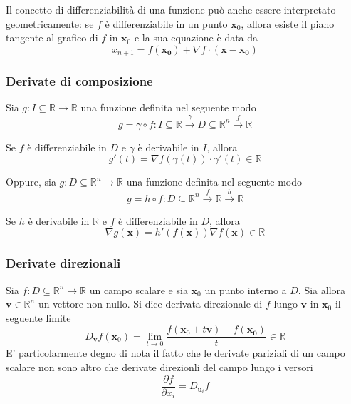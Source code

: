             Il concetto di differenziabilità di una funzione può anche essere interpretato geometricamente: se $f$ è differenziabile in un punto $\mathbf{x}_0$, allora
            esiste il piano tangente al grafico di $f$ in $\mathbf{x}_0$ e la sua equazione è data da
            \[
                x_{n + 1} = f(\mathbf{x_0}) + \nabla f \cdot (\mathbf{x} - \mathbf{x_0})
            \]

        \subsubsection{Derivate di composizione}
            Sia $g: I \subseteq \mathbb{R} \rightarrow \mathbb{R}$ una funzione definita nel seguente modo
            \[
                g = \gamma \circ f: I \subseteq \mathbb{R} \xrightarrow{\gamma} D \subseteq \mathbb{R}^{n} \xrightarrow{f} \mathbb{R}
            \]

            Se $f$ è differenziabile in $D$ e $\gamma$ è derivabile in $I$, allora
            \[
                g'(t) = \nabla f(\gamma(t)) \cdot \gamma'(t) \in \mathbb{R}
            \]

            Oppure, sia $g: D \subseteq \mathbb{R}^{n} \rightarrow \mathbb{R}$ una funzione definita nel seguente modo
            \[
                g = h \circ f : D \subseteq \mathbb{R}^{n} \xrightarrow{f} \mathbb{R} \xrightarrow{h} \mathbb{R}
            \]

            Se $h$ è derivabile in $\mathbb{R}$ e $f$ è differenziabile in $D$, allora
            \[
                \nabla g(\mathbf{x}) = h'(f(\mathbf{x})) \nabla f(\mathbf{x}) \in \mathbb{R}
            \]

        \subsubsection{Derivate direzionali}
            Sia $f: D \subseteq \mathbb{R}^{n} \rightarrow \mathbb{R}$ un campo scalare e sia $\mathbf{x}_0$ un punto interno a $D$. Sia allora $\mathbf{v} \in \mathbb{R}^{n}$ un vettore non nullo. Si dice derivata direzionale
            di $f$ lungo $\mathbf{v}$ in $\mathbf{x}_0$ il seguente limite
            \[
                D_{\mathbf{v}} f(\mathbf{x}_0) = \lim_{t \rightarrow 0} \frac{f(\mathbf{x}_0 + t \mathbf{v}) - f(\mathbf{x_0})}{t} \in \mathbb{R}
            \]
            E' particolarmente degno di nota il fatto che le derivate pariziali di un campo scalare non sono altro che derivate direzionli del campo lungo i versori
            \[
                \frac{\partial f} {\partial x_i} = D_{\mathbf{u}_i} f
            \]

